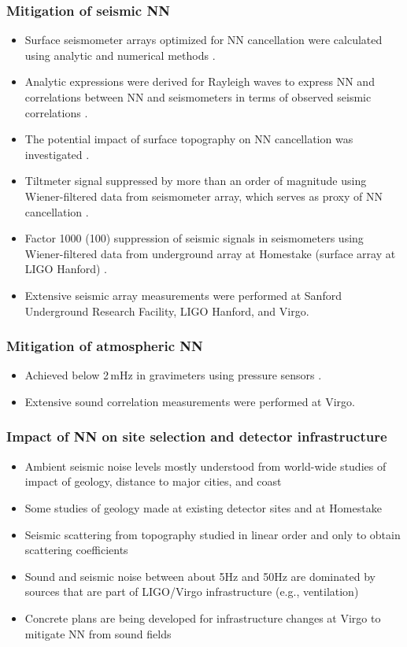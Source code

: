 \subsubsection*{Mitigation of seismic NN}
\begin{itemize}
\item Surface seismometer arrays optimized for NN cancellation were calculated using analytic and numerical methods \cite{Har2015,CoEA2016a}. 
\item Analytic expressions were derived for Rayleigh waves to express NN and correlations between NN and seismometers in terms of observed seismic correlations \cite{Har2015,CoEA2016a}.
\item The potential impact of surface topography on NN cancellation was investigated \cite{CoHa2012}.
\item Tiltmeter signal suppressed by more than an order of magnitude using Wiener-filtered data from seismometer array, which serves as proxy of NN cancellation \cite{HaVe2016,CoEA2018}.
\item Factor 1000 (100) suppression of seismic signals in seismometers using Wiener-filtered data from underground array at Homestake (surface array at LIGO Hanford) \cite{CoEA2014,CoEA2018}.
\item Extensive seismic array measurements were performed at Sanford Underground Research Facility, LIGO Hanford, and Virgo.
\end{itemize}

\subsubsection*{Mitigation of atmospheric NN}
\begin{itemize}
\item Achieved below 2\,mHz in gravimeters using pressure sensors \cite{HCW2007}.
\item Extensive sound correlation measurements were performed at Virgo.
\end{itemize}

\subsubsection*{Impact of NN on site selection and detector infrastructure}
\begin{itemize}
\item Ambient seismic noise levels mostly understood from world-wide studies of impact of geology, distance to major cities, and coast
\item Some studies of geology made at existing detector sites and at Homestake
\item Seismic scattering from topography studied in linear order and only to obtain scattering coefficients
\item Sound and seismic noise between about 5Hz and 50Hz are dominated by sources that are part of LIGO/Virgo infrastructure (e.g., ventilation)
\item Concrete plans are being developed for infrastructure changes at Virgo to mitigate NN from sound fields 
\end{itemize}

